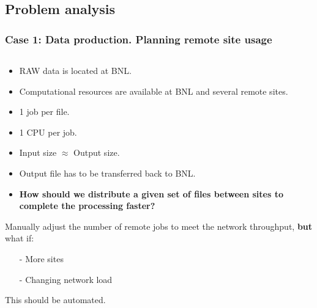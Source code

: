\documentclass{beamer}
\begin{document}
\subsection{Problem analysis}
\begin{frame}\frametitle{Case 1: Data production. Planning remote site usage }
 	\begin{columns}[c] %
    \begin{footnotesize}
    \vspace{-11mm}
	\begin{block}{}
		\begin{itemize}
		\item RAW data is located at BNL.
		\item Computational resources are available at BNL and several remote sites.
		\item 1 job per file.
		\item 1 CPU per job. 
		\item Input size $\approx$ Output size.
		\item Output file has to be transferred back to BNL.
		\item \textbf{How should we distribute a given set of files between sites to complete the processing faster?}
		\end{itemize}
 	\end{block} 	
 	
 	\begin{block}{}
 	Manually adjust the number of remote jobs to meet the network throughput, \textbf{but} what if:
		\begin{itemize}
		\item[-] More sites
		\item[-] Changing network load
		\end{itemize}
	This should be automated.
 	\end{block}  	     


\end{footnotesize}
\end{columns}
\end{frame}
\end{document}

